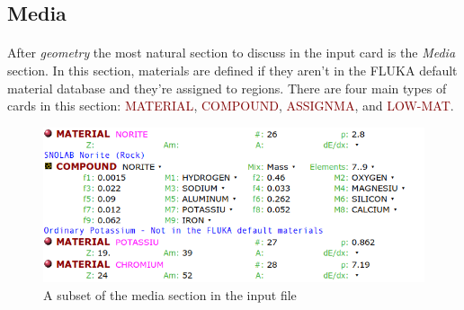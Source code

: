 
\subsection{Media}
\paragraph{}
After \textit{geometry} the most natural section to discuss in the input card is the \textit{Media} section. In this section, materials are defined if they aren't in the FLUKA default material database and they're assigned to regions. There are four main types of cards in this section: \textcolor{Maroon}{MATERIAL}, \textcolor{Maroon}{COMPOUND}, \textcolor{Maroon}{ASSIGNMA}, and \textcolor{Maroon}{LOW-MAT}. 

\begin{figure}[h]
    \begin{center}
    \includegraphics[scale=0.5]{figures/media_1.png}
    \caption{A subset of the media section in the input file}
    \label{fig:media1}
    \end{center}
\end{figure}

